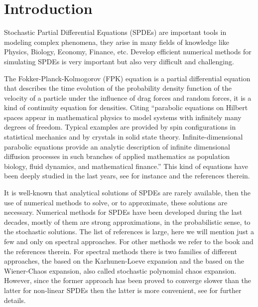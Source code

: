 \documentclass[]{interact}
\theoremstyle{plain}%
\theoremstyle{definition}
\theoremstyle{remark}
\begin{document}
\section{Introduction}
        Stochastic Partial Differential Equations (SPDEs) are important tools in
    modeling complex phenomena, they arise in many fields of knowledge like
    Physics, Biology, Economy, Finance, etc. Develop efficient numerical
    methods for simulating SPDEs is very important but also very difficult and
    challenging.
    
        The  Fokker-Planck-Kolmogorov (FPK) equation is a partial differential
    equation that describes the time evolution of the probability density 
    function of the velocity of a particle under the influence of drag forces 
    and random forces, it is a kind of continuity equation for densities. 
    Citing \cite{da-za}
    ``parabolic equations on Hilbert spaces appear in mathematical physics to 
    model systems with infinitely many degrees of freedom. Typical examples are 
    provided by spin configurations in statistical mechanics and by crystals in 
    solid state theory. Infinite-dimensional parabolic equations provide an 
    analytic description of infinite dimensional diffusion processes in such 
    branches of applied mathematics as population biology, fluid dynamics, and 
    mathematical finance.'' This kind of equations have been deeply studied in 
    the last years, see for instance \cite{bo-da-ro, da-fl-ro, da} and the 
    references therein.
    
        It is well-known that analytical solutions of SPDEs are rarely  
     available, then the use of numerical methods to solve, or to approximate,
     these solutions are necessary. Numerical methods for SPDEs have been
     developed during the last decades, mostly of them are strong
     approximations, in the probabilistic sense, to the stochastic solutions.
     The list of references is large, here we will mention just a few and only
     on spectral approaches. For other methods we refer to the book
     \cite{milstein2013stochastic} and the references therein. For spectral
     methods there is two families of different approaches, the based on the
     Karhunen-Loeve expansion and the based on the Wiener-Chaos expansion, also
     called  stochastic polynomial chaos expansion. However, since the former
     approach has been proved to converge slower than the latter for non-linear
     SPDEs then the latter is more convenient, see \cite{zhang2017numerical} for
     further details.
\end{document}
